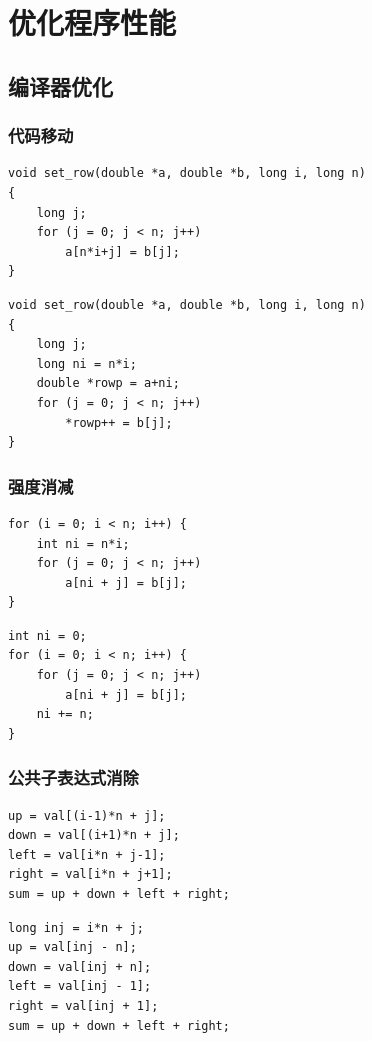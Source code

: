 \section{优化程序性能}

\subsection{编译器优化}

\subsubsection{代码移动}

\begin{lstlisting}[style=CStyle]
void set_row(double *a, double *b, long i, long n)
{
    long j;
    for (j = 0; j < n; j++)
        a[n*i+j] = b[j];
}
\end{lstlisting}
\begin{lstlisting}[style=CStyle]
void set_row(double *a, double *b, long i, long n)
{
    long j;
    long ni = n*i;
    double *rowp = a+ni;
    for (j = 0; j < n; j++)
        *rowp++ = b[j];
}
\end{lstlisting}
\subsubsection{强度消减}

\begin{lstlisting}[style=CStyle]
for (i = 0; i < n; i++) {
    int ni = n*i;
    for (j = 0; j < n; j++)
        a[ni + j] = b[j];
}
\end{lstlisting}
\begin{lstlisting}[style=CStyle]
int ni = 0;
for (i = 0; i < n; i++) {
    for (j = 0; j < n; j++)
        a[ni + j] = b[j];
    ni += n;
}
\end{lstlisting}
\subsubsection{公共子表达式消除}

\begin{lstlisting}[style=CStyle]
up = val[(i-1)*n + j];
down = val[(i+1)*n + j];
left = val[i*n + j-1];
right = val[i*n + j+1];
sum = up + down + left + right;
\end{lstlisting}
\begin{lstlisting}[style=CStyle]
long inj = i*n + j;
up = val[inj - n];
down = val[inj + n];
left = val[inj - 1];
right = val[inj + 1];
sum = up + down + left + right;
\end{lstlisting}

